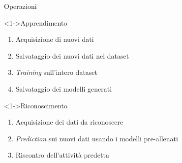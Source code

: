 \begin{tframe}{Operazioni}

    \begin{block}<1->{Apprendimento}

        \begin{enumerate}
            \item Acquisizione di nuovi dati
            \item Salvataggio dei nuovi dati nel dataset
            \item \textit{Training} sull'intero dataset
            \item Salvataggio dei modelli generati
        \end{enumerate}

    \end{block}

    \begin{block}<1->{Riconoscimento}

        \begin{enumerate}
            \item Acquisizione dei dati da riconoscere
            \item \textit{Prediction} sui nuovi dati usando i modelli pre-allenati
            \item Riscontro dell'attività predetta  
        \end{enumerate}

    \end{block}    

\end{tframe}